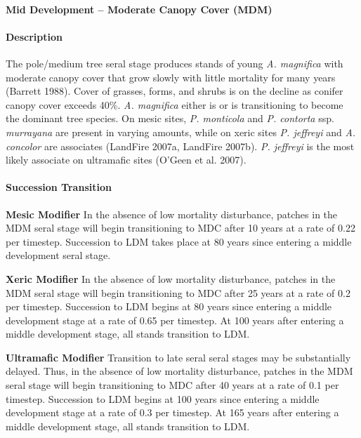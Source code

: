 \noindent\hrulefill

\paragraph{Mid Development – Moderate Canopy Cover (MDM)}

\paragraph{Description} The pole/medium tree seral stage produces stands of young \emph{A. magnifica} with moderate canopy cover that grow slowly with little mortality for many years (Barrett 1988). Cover of grasses, forms, and shrubs is on the decline as conifer canopy cover exceeds 40\%. \emph{A. magnifica} either is or is transitioning to become the dominant tree species. On mesic sites, \emph{P. monticola} and \emph{P. contorta} ssp. \emph{murrayana} are present in varying amounts, while on xeric sites \emph{P. jeffreyi} and \emph{A. concolor} are associates (LandFire 2007a, LandFire 2007b). \emph{P. jeffreyi} is the most likely associate on ultramafic sites (O'Geen et al. 2007).

\paragraph{Succession Transition}
\begin{adjustwidth}{2cm}{}
\noindent \textbf{Mesic Modifier } In the absence of low mortality disturbance, patches in the MDM seral stage will begin transitioning to MDC after 10 years at a rate of 0.22 per timestep. Succession to LDM takes place at 80 years since entering a middle development seral stage. 

\medskip
\noindent \textbf{Xeric Modifier}  In the absence of low mortality disturbance, patches in the MDM seral stage will begin transitioning to MDC after 25 years at a rate of 0.2 per timestep. Succession to LDM begins at 80 years since entering a middle development stage at a rate of 0.65 per timestep. At 100 years after entering a middle development stage, all stands transition to LDM. 

\medskip
\noindent \textbf{Ultramafic Modifier} Transition to late seral seral stages may be substantially delayed. Thus, in the absence of low mortality disturbance, patches in the MDM seral stage will begin transitioning to MDC after 40 years at a rate of 0.1 per timestep. Succession to LDM begins at 100 years since entering a middle development stage at a rate of 0.3 per timestep. At 165 years after entering a middle development stage, all stands transition to LDM. 

\end{adjustwidth}

